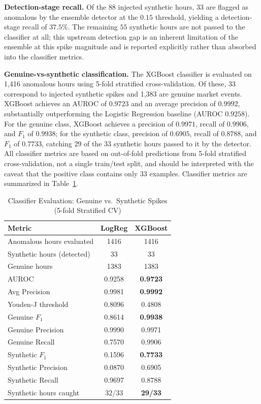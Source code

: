 \documentclass[journal]{IEEEtran}
\begin{document}
\textbf{Detection-stage recall.} Of the 88 injected synthetic hours, $33$ are flagged as anomalous by the ensemble detector at the $0.15$ threshold, yielding a detection-stage recall of $37.5\%$. The remaining $55$ synthetic hours are not passed to the classifier at all; this upstream detection gap is an inherent limitation of the ensemble at this spike magnitude and is reported explicitly rather than absorbed into the classifier metrics.

\textbf{Genuine-vs-synthetic classification.} The XGBoost classifier is evaluated on 1,416 anomalous hours using 5-fold stratified cross-validation. Of these, 33 correspond to injected synthetic spikes and 1,383 are genuine market events. XGBoost achieves an AUROC of $0.9723$ and an average precision of $0.9992$, substantially outperforming the Logistic Regression baseline (AUROC $0.9258$). For the genuine class, XGBoost achieves a precision of $0.9971$, recall of $0.9906$, and $F_1$ of $0.9938$; for the synthetic class, precision of $0.6905$, recall of $0.8788$, and $F_1$ of $0.7733$, catching $29$ of the $33$ synthetic hours passed to it by the detector. All classifier metrics are based on out-of-fold predictions from 5-fold stratified cross-validation, not a single train/test split, and should be interpreted with the caveat that the positive class contains only 33 examples. Classifier metrics are summarized in Table~\ref{tab:classifier}.

\begin{table}[!t]
\centering
\caption{Classifier Evaluation: Genuine vs.\ Synthetic Spikes (5-fold Stratified CV)}
\label{tab:classifier}
\begin{tabular}{lcc}
\hline
\textbf{Metric} & \textbf{LogReg} & \textbf{XGBoost} \\
\hline
Anomalous hours evaluated   & 1416 & 1416 \\
Synthetic hours (detected)  & 33 & 33 \\
Genuine hours               & 1383 & 1383 \\
AUROC                       & 0.9258 & \textbf{0.9723} \\
Avg Precision               & 0.9981 & \textbf{0.9992} \\
Youden-J threshold          & 0.8096 & 0.4808 \\
Genuine $F_1$               & 0.8614 & \textbf{0.9938} \\
Genuine Precision           & 0.9990 & 0.9971 \\
Genuine Recall              & 0.7570 & 0.9906 \\
Synthetic $F_1$             & 0.1596 & \textbf{0.7733} \\
Synthetic Precision         & 0.0870 & 0.6905 \\
Synthetic Recall            & 0.9697 & 0.8788 \\
Synthetic hours caught      & 32/33 & \textbf{29/33} \\
\hline
\end{tabular}
\end{table}
\end{document}
